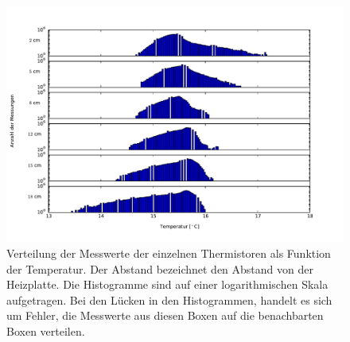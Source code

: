 \begin{figure}
	\centering
	\includegraphics[width=\textwidth]{plots/T_hist.pdf}\caption{Verteilung der Messwerte der einzelnen Thermistoren als Funktion der Temperatur. Der Abstand bezeichnet den Abstand von der Heizplatte. Die Histogramme sind auf einer logarithmischen Skala aufgetragen. Bei den Lücken in den Histogrammen, handelt es sich um Fehler, die Messwerte aus diesen Boxen auf die benachbarten Boxen verteilen.}\label{fig:hist}
\end{figure}

